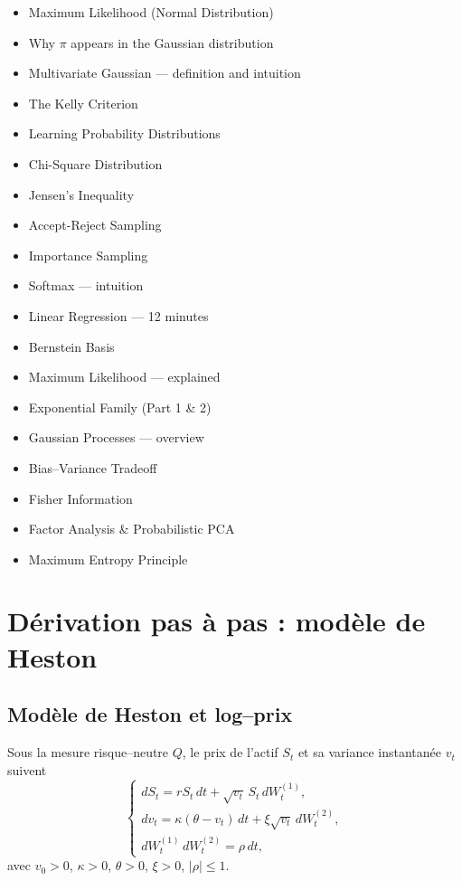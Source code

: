 \documentclass[11pt,a4paper]{article}
\newcommand{\1}{\mathbf{1}}
\begin{document}
\begin{itemize}
  \item Maximum Likelihood (Normal Distribution)
  \item Why $\pi$ appears in the Gaussian distribution
  \item Multivariate Gaussian --- definition and intuition
  \item The Kelly Criterion
  \item Learning Probability Distributions
  \item Chi-Square Distribution
  \item Jensen's Inequality
  \item Accept-Reject Sampling
  \item Importance Sampling
  \item Softmax --- intuition
  \item Linear Regression --- 12 minutes
  \item Bernstein Basis
  \item Maximum Likelihood --- explained
  \item Exponential Family (Part 1 \& 2)
  \item Gaussian Processes --- overview
  \item Bias--Variance Tradeoff
  \item Fisher Information
  \item Factor Analysis \& Probabilistic PCA
  \item Maximum Entropy Principle
\end{itemize}


\fi
\section{D\'erivation pas \`a pas : mod\`ele de Heston}
\label{sec:deriv-heston}



\subsection{Mod\`ele de Heston et log--prix}

Sous la mesure risque--neutre $Q$, le prix de l'actif $S_t$ et sa variance
instantan\'ee $v_t$ suivent
\begin{equation}
\begin{cases}
dS_t = r S_t\,dt + \sqrt{v_t}\,S_t\,dW^{(1)}_t, \\[3pt]
dv_t = \kappa(\theta - v_t)\,dt + \xi\sqrt{v_t}\,dW^{(2)}_t, \\[3pt]
dW^{(1)}_t\,dW^{(2)}_t = \rho\,dt,
\end{cases}
\end{equation}
avec $v_0 > 0$, $\kappa>0$, $\theta>0$, $\xi>0$, $|\rho|\le 1$.
\end{document}
